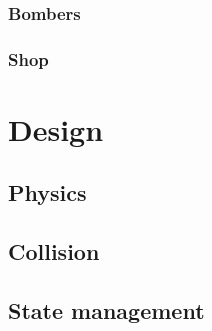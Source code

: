 \documentclass{article}
\begin{document}
\subsubsection*{Bombers}

\subsubsection*{Shop}



\section{Design}


\subsection{Physics}


\subsection{Collision}
 

\subsection{State management}
\end{document}
